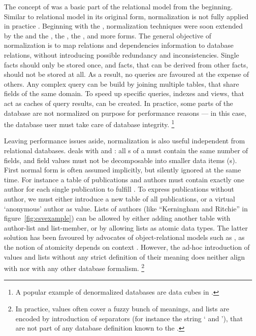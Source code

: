 The concept of   
was a basic part of the relational model from the beginning.
Similar to relational model in its original form, normalization is not 
fully applied in practice \cite{Fotache2006}. Beginning with the 
, normalization techniques were soon 
extended by the  and the 
\cite{Codd1971}, the  \cite{Codd1974},
the  \cite{Fagin1977}, and more forms. The 
general objective of normalization is to map relations and dependencies
information to database relations, without introducing possible redundancy
and inconsistencies. Single facts should only be stored once, and facts, that
can be derived from other facts, should not be stored at all. As a result,
no queries are favoured at the expense of others. Any complex query can 
be build by joining multiple tables, that share fields of the same domain.
To speed up specific queries, indexes and views, that act
as caches of query results, can be created. In practice, some parts of the database are
not normalized on purpose for performance reasons --- in this case, the
database user must take care of database integrity.%
\footnote{A popular example of denormalized databases are data cubes in
.}

Leaving performance issues aside, normalization is also useful independent
from relational databases.  deals with  and 
: all s of a  must contain
the same number of fields, and field values must not be decomposable into
smaller data items (s). First normal form is often assumed
implicitly, but silently ignored at the same time. For instance a table
of publications and authors must contain exactly one author for each 
single publication to fulfill . To express publications without
author, we must either introduce a new table of all publications, or
a virtual `anonymous' author as  value.  Lists of
authors (like ``Kerningham and Ritchie'' in figure~\ref{fig:csvexample})
can be allowed by either adding another table with author-list
and list-member, or by allowing lists as atomic data types. The latter 
solution has been favoured by advocates of object-relational models
such as \textcite{Darwen1995}, as the notion of atomicity depends
on context \cite{Fotache2006}. However, the ad-hoc introduction of
 values and lists without any strict definition of their
meaning does neither align with  nor with any other database 
formalism.%
\footnote{In practice,  values often cover a fuzzy bunch of
meanings, and lists are encoded by introduction of separators (for instance 
the string ` and '), that are not part of any database definition 
known to the .}

